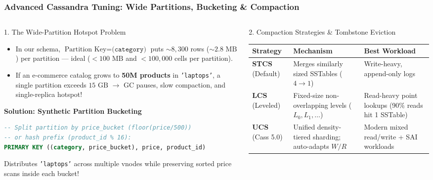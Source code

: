 \documentclass[aspectratio=169]{beamer}
\begin{document}
\begin{frame}[fragile]
\frametitle{Advanced Cassandra Tuning: Wide Partitions, Bucketing \& Compaction}
\begin{columns}[T]
\begin{column}{0.49\textwidth}
\begin{alertblock}{\tiny 1. The Wide-Partition Hotspot Problem}
\tiny
\begin{itemize}
    \item In our schema, $\text{Partition Key} = \texttt{(category)}$ puts $\sim\!8,300$ rows ($\sim\!2.8\text{ MB}$) per partition --- ideal ($<100\text{ MB}$ and $<100,000$ cells per partition).
    \item If an e-commerce catalog grows to \textbf{50M products} in \texttt{'laptops'}, a single partition exceeds $15\text{ GB}$ $\rightarrow$ GC pauses, slow compaction, and single-replica hotspot!
\end{itemize}
\end{alertblock}
\textbf{\tiny Solution: Synthetic Partition Bucketing}
\begin{lstlisting}[language=SQL]
-- Split partition by price_bucket (floor(price/500))
-- or hash prefix (product_id % 16):
PRIMARY KEY ((category, price_bucket), price, product_id)
\end{lstlisting}
\tiny
Distributes \texttt{'laptops'} across multiple vnodes while preserving sorted price scans inside each bucket!
\end{column}
\begin{column}{0.48\textwidth}
\begin{block}{\tiny 2. Compaction Strategies \& Tombstone Eviction}
\centering
\tiny
\renewcommand{\arraystretch}{1.0}
\begin{tabular}{p{1.2cm}p{2.3cm}p{2.3cm}}
\toprule
\textbf{Strategy} & \textbf{Mechanism} & \textbf{Best Workload} \\
\midrule
\textbf{STCS} (Default) & Merges similarly sized SSTables ($4\rightarrow 1$) & Write-heavy, append-only logs \\
\midrule
\textbf{LCS} (Leveled) & Fixed-size non-overlapping levels ($L_0, L_1, \dots$) & Read-heavy point lookups (90\% reads hit 1 SSTable) \\
\midrule
\textbf{UCS} (Cass 5.0) & Unified density-tiered sharding; auto-adapts $W/R$ & Modern mixed read/write + SAI workloads \\

\end{tabular}
\end{block}
\end{column}
\end{columns}
\end{frame}
\end{document}
